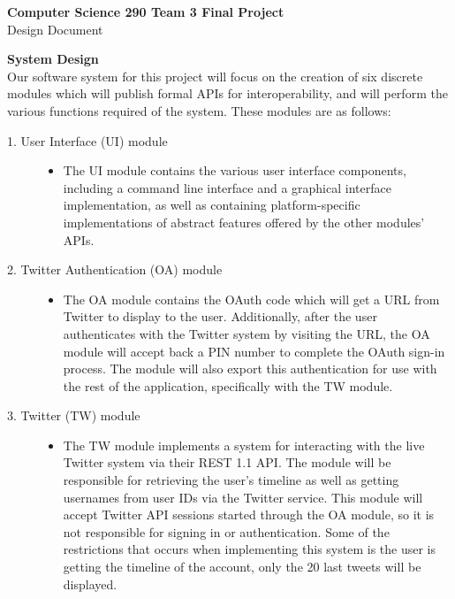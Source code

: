 \documentclass{article}
\begin{document}
\begin{center}

\textbf{Computer Science 290 Team 3 Final Project}
\\
Design Document
\end{center}
\noindent
\textbf{\Large System Design}
\\
Our software system for this project will focus on the creation of six discrete modules which will publish formal APIs for interoperability, and will perform the various functions required of the system. These modules are as follows:
\\
\begin{description}
\item[1. User Interface (UI) module] \hfill
\begin{itemize}
\item The UI module contains the various user interface components, including a command line interface and a graphical interface implementation, as well as containing platform-specific implementations of abstract features offered by the other modules' APIs.
\end{itemize}
\item[2. Twitter Authentication (OA) module] \hfill 
\begin{itemize}
\item The OA module contains the OAuth code which will get a URL from Twitter to display to the user. Additionally, after the user authenticates with the Twitter system by visiting the URL, the OA module will accept back a PIN number to complete the OAuth sign-in process. The module will also export this authentication for use with the rest of the application, specifically with the TW module.
\end{itemize}
\item[3. Twitter (TW) module] \hfill
\begin{itemize}
\item The TW module implements a system for interacting with the live Twitter system via their REST 1.1 API. The module will be responsible for retrieving the user's timeline as well as getting usernames from user IDs via the Twitter service. This module will accept Twitter API sessions started through the OA module, so it is not responsible for signing in or authentication. Some of the restrictions that occurs when implementing this system is the user is getting the timeline of the account, only the 20 last tweets will be displayed.
\\
\\


\end{itemize}
\end{description}
\end{document}
